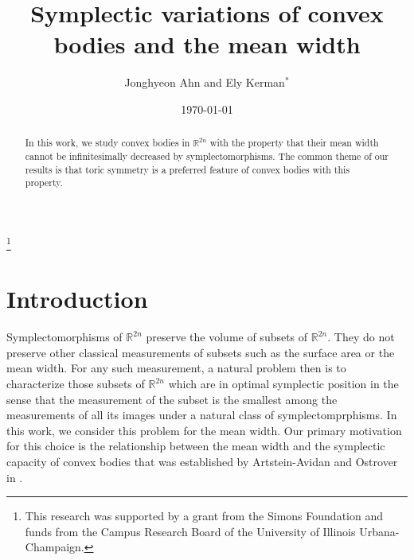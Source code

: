 \documentclass[12pt]{amsart}
\theoremstyle{definition}
\newcommand{\RR}{{\mathbb R}}
\begin{document}
\title[Symplectic variations of convex bodies and the mean width]{Symplectic variations of convex bodies and the mean width}
\author{Jonghyeon Ahn and Ely Kerman${}^*$}
\address{Department of Mathematics,
University of Illinois Urbana-Champaign\\Urbana, IL, 61801, USA.}
\thanks{This research was supported by a grant from the Simons Foundation and funds from the Campus Research Board of the University of Illinois Urbana-Champaign.}

\date{\today}

\begin{abstract}
In this work, we study convex bodies in $\RR^{2n}$ with the property that their mean width cannot be infinitesimally decreased by  symplectomorphisms. 
The common theme of our results is that toric symmetry is a preferred feature of convex bodies with this property. 
\end{abstract}



\maketitle

\section{Introduction}   

Symplectomorphisms of $\RR^{2n}$ preserve the volume of subsets of $\RR^{2n}$. They do not preserve other classical measurements of subsets such as the surface area or the mean width. For any such measurement,  a natural problem then is to characterize those subsets of $\RR^{2n}$ which are in optimal symplectic position in the sense that the measurement of the subset is the smallest among the measurements of all its images under a natural class of  symplectomprphisms. In this work, we consider this problem for the mean width. Our primary motivation for this choice is the relationship between the mean width and the symplectic capacity of convex bodies that was established by Artstein-Avidan and Ostrover in \cite{ao}.
\end{document}
